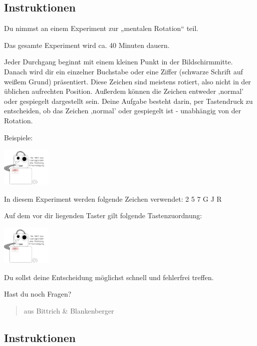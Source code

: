 \documentclass[
]{book}
\begin{document}
\hypertarget{instruktionen-2}{%
\subsection{Instruktionen}\label{instruktionen-2}}

Du nimmst an einem Experiment zur „mentalen Rotation`` teil.

Das gesamte Experiment wird ca. 40 Minuten dauern.

Jeder Durchgang beginnt mit einem kleinen Punkt in der Bildschirmmitte. Danach wird dir ein
einzelner Buchstabe oder eine Ziffer (schwarze Schrift auf weißem Grund) präsentiert. Diese
Zeichen sind meistens rotiert, also nicht in der üblichen aufrechten Position. Außerdem können
die Zeichen entweder ‚normal' oder gespiegelt dargestellt sein.
Deine Aufgabe besteht darin, per Tastendruck zu entscheiden,
ob das Zeichen ‚normal' oder gespiegelt ist - unabhängig von der Rotation.

Beispiele:

\begin{center}\includegraphics[width=66.6666666666667pt]{imgs/copyright} \end{center}

In diesem Experiment werden folgende Zeichen verwendet: 2 5 7 G J R

Auf dem vor dir liegenden Taster gilt folgende Tastenzuordnung:

\begin{center}\includegraphics[width=66.6666666666667pt]{imgs/copyright} \end{center}

Du sollst deine Entscheidung möglichst schnell und fehlerfrei treffen.

Hast du noch Fragen?

\begin{quote}
aus Bittrich \& Blankenberger
\end{quote}

\hypertarget{instruktionen-3}{%
\subsection{Instruktionen}\label{instruktionen-3}}
\end{document}
